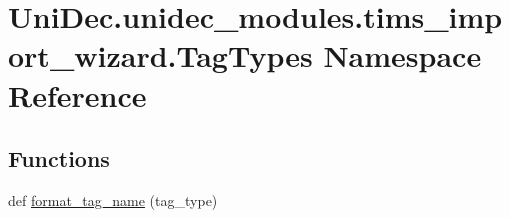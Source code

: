 \hypertarget{namespace_uni_dec_1_1unidec__modules_1_1tims__import__wizard_1_1_tag_types}{}\section{Uni\+Dec.\+unidec\+\_\+modules.\+tims\+\_\+import\+\_\+wizard.\+Tag\+Types Namespace Reference}
\label{namespace_uni_dec_1_1unidec__modules_1_1tims__import__wizard_1_1_tag_types}
\subsection*{Functions}
\begin{DoxyCompactItemize}
\item 
def \hyperlink{namespace_uni_dec_1_1unidec__modules_1_1tims__import__wizard_1_1_tag_types_aaacc4fc5a568d0202cd9c780dc470aa5}{format\+\_\+tag\+\_\+name} (tag\+\_\+type)
\end{DoxyCompactItemize}
